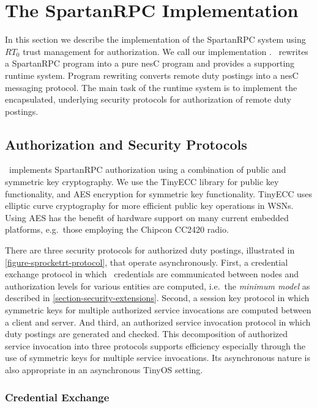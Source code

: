 \section{The SpartanRPC Implementation}
\label{section-implementation}

In this section we describe the implementation of the SpartanRPC system
using $RT_0$ trust management for authorization. We call our
implementation \Sprocket \cite{sprocket}. \Sprocket\ rewrites a
SpartanRPC program into a pure nesC program and provides a supporting
runtime system. Program rewriting converts remote duty postings into a
nesC messaging protocol. The main task of the runtime system is to
implement the encapsulated, underlying security protocols for
authorization of remote duty postings.

\subsection{Authorization and Security Protocols}
\label{section-security-protocols}
\label{section-underlying-protocols}

\Sprocket\ implements SpartanRPC authorization using a combination of
public and symmetric key cryptography. We use the TinyECC library
\cite{Liu-Peng-TinyECC-2008} for public key functionality, and AES
encryption for symmetric key functionality. TinyECC uses elliptic curve
cryptography for more efficient public key operations in WSNs. Using AES
has the benefit of hardware support on many current embedded platforms,
e.g.~those employing the Chipcon CC2420 radio.

There are three security protocols for authorized duty postings,
illustrated in \autoref{figure-sprocketrt-protocol}, that operate
asynchronously. First, a credential exchange protocol in which \RT\
credentials are communicated between nodes and authorization levels for
various entities are computed, i.e.~the \emph{minimum model} as
described in \autoref{section-security-extensions}. Second, a session
key protocol in which symmetric keys for multiple authorized service
invocations are computed between a client and server. And third, an
authorized service invocation protocol in which duty postings are
generated and checked. This decomposition of authorized service
invocation into three protocols supports efficiency especially through
the use of symmetric keys for multiple service invocations. Its
asynchronous nature is also appropriate in an asynchronous TinyOS
setting.

\subsubsection{Credential Exchange}

